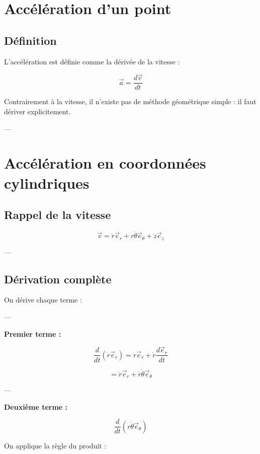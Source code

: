 \documentclass[11pt,a4paper]{article}
\begin{document}
\section{Accélération d’un point}

\subsection{Définition}

L’accélération est définie comme la dérivée de la vitesse :

\[
\vec{a} = \frac{d\vec{v}}{dt}
\]

\bigskip

Contrairement à la vitesse, il n’existe pas de méthode géométrique simple :
il faut dériver explicitement.

---

\section{Accélération en coordonnées cylindriques}

\subsection{Rappel de la vitesse}

\[
\vec{v} =
\dot{r}\vec{e}_r + r\dot{\theta}\vec{e}_\theta + \dot{z}\vec{e}_z
\]

---

\subsection{Dérivation complète}

On dérive chaque terme :

---

\textbf{Premier terme :}

\[
\frac{d}{dt}(\dot{r}\vec{e}_r)
=
\ddot{r}\vec{e}_r + \dot{r}\frac{d\vec{e}_r}{dt}
\]

\[
= \ddot{r}\vec{e}_r + \dot{r}\dot{\theta}\vec{e}_\theta
\]

---

\textbf{Deuxième terme :}

\[
\frac{d}{dt}(r\dot{\theta}\vec{e}_\theta)
\]

On applique la règle du produit :
\end{document}
